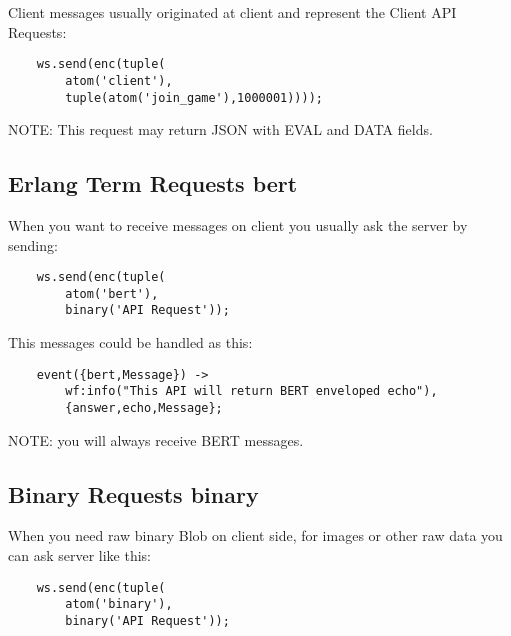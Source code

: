 Client messages usually originated at client and represent the Client API Requests:

\vspace{1\baselineskip}
\begin{lstlisting}
    ws.send(enc(tuple(
        atom('client'),
        tuple(atom('join_game'),1000001))));
\end{lstlisting}
\vspace{1\baselineskip}

NOTE: This request may return JSON with EVAL and DATA fields.

\newpage
\subsection{Erlang Term Requests {\bf bert}}

When you want to receive  messages on client you usually ask the
server by sending:

\vspace{1\baselineskip}
\begin{lstlisting}
    ws.send(enc(tuple(
        atom('bert'),
        binary('API Request'));
\end{lstlisting}
\vspace{1\baselineskip}

This messages could be handled as this:

\vspace{1\baselineskip}
\begin{lstlisting}
    event({bert,Message}) ->
        wf:info("This API will return BERT enveloped echo"),
        {answer,echo,Message};
\end{lstlisting}
\vspace{1\baselineskip}

NOTE: you will always receive BERT messages.

\subsection{Binary Requests {\bf binary}}

When you need raw binary Blob on client side,
for images or other raw data you can ask server like this:

\vspace{1\baselineskip}
\begin{lstlisting}
    ws.send(enc(tuple(
        atom('binary'),
        binary('API Request'));
\end{lstlisting}
\vspace{1\baselineskip}


